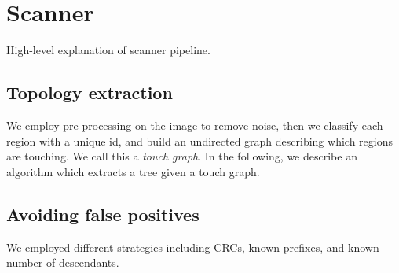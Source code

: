 \section{Scanner}

High-level explanation of scanner pipeline. 

\subsection[topology]{Topology extraction}

We employ pre-processing on the image to remove noise, then we classify each region with a unique id, and build an undirected graph describing which regions are touching. We call this a \textit{touch graph}. In the following, we describe an algorithm which extracts a tree given a touch graph.

\subsection[falsePositives]{Avoiding false positives}

We employed different strategies including CRCs, known prefixes, and known number of descendants.